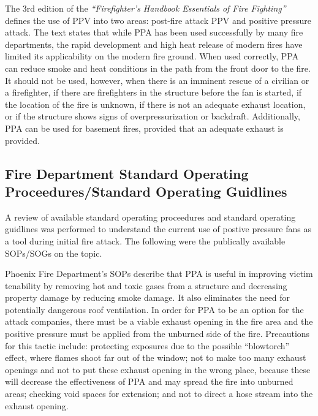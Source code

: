 \documentclass{article}
\begin{document}
The 3rd edition of the \textit{``Firefighter’s Handbook Essentials of Fire Fighting''} defines the use of PPV into two areas: post-fire attack PPV and positive pressure attack. The text states that while PPA has been used successfully by many fire departments, the rapid development and high heat release of modern fires have limited its applicability on the modern fire ground. When used correctly, PPA can reduce smoke and heat conditions in the path from the front door to the fire. It should not be used, however, when there is an imminent rescue of a civilian or a firefighter, if there are firefighters in the structure before the fan is started, if the location of the fire is unknown, if there is not an adequate exhaust location, or if the structure shows signs of overpressurization or backdraft. Additionally, PPA can be used for basement fires, provided that an adequate exhaust is provided.\cite{FFHandbook}

\subsection{Fire Department Standard Operating Proceedures/Standard Operating Guidlines}
A review of available standard operating proceedures and standard operating guidlines was performed to understand the current use of postive pressure fans as a tool during initial fire attack. The following were the publically available SOPs/SOGs on the topic. 

Phoenix Fire Department's SOPs describe that PPA is useful in improving victim tenability by removing hot and toxic gases from a structure and decreasing property damage by reducing smoke damage. It also eliminates the need for potentially dangerous roof ventilation. In order for PPA to be an option for the attack companies, there must be a viable exhaust opening in the fire area and the positive pressure must be applied from the unburned side of the fire. Precautions for this tactic include: protecting exposures due to the possible “blowtorch” effect, where flames shoot far out of the window; not to make too many exhaust openings and not to put these exhaust opening in the wrong place, because these will decrease the effectiveness of PPA and may spread the fire into unburned areas; checking void spaces for extension; and not to direct a hose stream into the exhaust opening.\cite{PhoenixPPVSOG}
\end{document}
